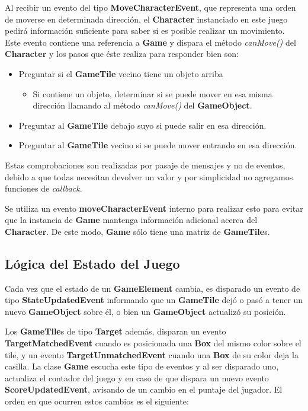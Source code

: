 \documentclass[a4paper,12pt,titlepage]{article}
\begin{document}
Al recibir un evento del tipo \textbf{MoveCharacterEvent}, que representa una orden de moverse en determinada dirección, el \textbf{Character} instanciado en este juego pedirá información suficiente para saber si es posible realizar un movimiento.
Este evento contiene una referencia a \textbf{Game} y dispara el método \emph{canMove()} del \textbf{Character} y los pasos que éste realiza para responder bien son:

\begin{itemize}
 \item Preguntar si el \textbf{GameTile} vecino tiene un objeto arriba
 \begin{itemize}
  \item Si contiene un objeto, determinar si se puede mover en esa misma dirección llamando al método \textit{canMove()} del \textbf{GameObject}.
 \end{itemize}
 \item Preguntar al \textbf{GameTile} debajo suyo si puede salir en esa dirección.
 \item Preguntar al \textbf{GameTile} vecino si se puede mover entrando en esa dirección.
\end{itemize}

Estas comprobaciones son realizadas por pasaje de mensajes y no de eventos, debido a que todas necesitan devolver un valor y por simplicidad no agregamos funciones de \emph{callback}.

Se utiliza un evento \textbf{moveCharacterEvent} interno para realizar esto para evitar que la instancia de \textbf{Game} mantenga información adicional acerca del \textbf{Character}. De este modo, \textbf{Game} sólo tiene una matriz de \textbf{GameTile}s.

\subsection{Lógica del Estado del Juego}

Cada vez que el estado de un \textbf{GameElement} cambia, es disparado un evento de tipo \textbf{StateUpdatedEvent} informando que un \textbf{GameTile} dejó o pasó a tener un nuevo \textbf{GameObject} sobre él, o bien un \textbf{GameObject} actualizó su posición.

Los \textbf{GameTile}s de tipo \textbf{Target} además, disparan un evento \textbf{TargetMatchedEvent} cuando es posicionada una \textbf{Box} del mismo color sobre el tile, y un evento \textbf{TargetUnmatchedEvent} cuando una \textbf{Box} de su color deja la casilla. La clase \textbf{Game} escucha este tipo de eventos y al ser disparado uno, actualiza el contador del juego y en caso de que dispara un nuevo evento \textbf{ScoreUpdatedEvent}, avisando de un cambio en el puntaje del jugador. El orden en que ocurren estos cambios es el siguiente:
\end{document}
